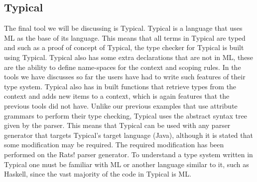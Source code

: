 \subsection{Typical}
\label{sec:typical}
The final tool we will be discussing is Typical\cite{grimm2007typical}.
Typical is a language that uses ML\cite{milner1997definition} as the base of its language.
This means that all terms in Typical are typed and such as a proof of concept of Typical, the type checker for Typical is built using Typical.
Typical also has some extra declarations that are not in ML, these are the ability to define name-spaces for the context and scoping rules.
In the tools we have discusses so far the users have had to write such features of their type system.
Typical also has in built functions that retrieve types from the context and adds new items to a context, which is again features that the previous tools did not have.
Unlike our previous examples that use attribute grammars to perform their type checking, Typical uses the abstract syntax tree given by the parser.
This means that Typical can be used with any parser generator that targets Typical's target language (Java), although it is stated that some modification may be required.
The required modification has been performed on the Rats! parser generator\cite{Grimm:2006:BET:1133255.1133987}.
To understand a type system written in Typical one must be familiar with ML or another language similar to it, such as Haskell, since the vast majority of the code in Typical is ML.
